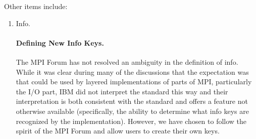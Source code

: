 \documentclass{article}
\begin{document}
\begin{enumerate}

  Other items include:

  \begin{enumerate}
  \item Info.
\paragraph{Defining New Info Keys.}
The MPI Forum has not resolved an ambiguity in the definition of
info.  While it was clear during many of the discussions that the
expectation was that  could be used by
layered implementations of parts of MPI, particularly the I/O part,
IBM did not interpret the standard this way and their interpretation
is both consistent with the standard and offers a feature not
otherwise available (specifically, the ability to determine what info
keys are recognized by the implementation).  However, we have chosen to follow
the spirit of the MPI Forum and allow users to create their own keys.



\end{enumerate}
\end{enumerate}
\end{document}
